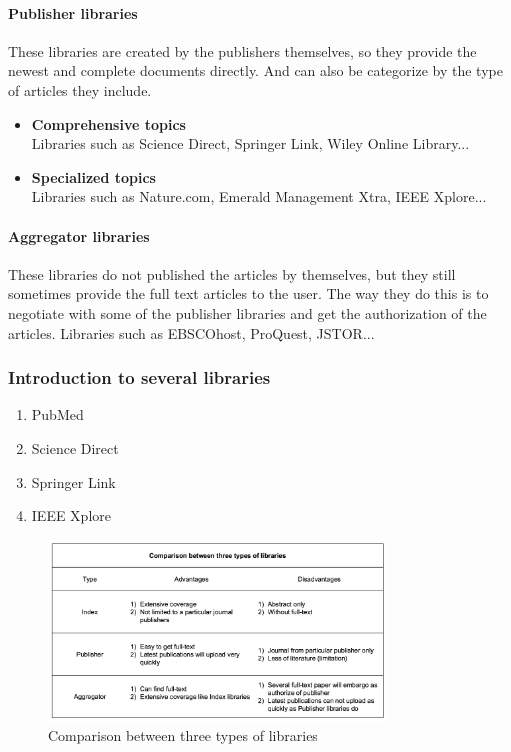 \paragraph{Publisher libraries}
	These libraries are created by the publishers themselves, so they provide the newest and complete documents directly. And can also be categorize by the type of articles they include.
	\begin{itemize}
		\item\textbf{Comprehensive topics}\\Libraries such as Science Direct, Springer Link, Wiley Online Library...
		\item\textbf{Specialized topics}\\Libraries such as Nature.com, Emerald Management Xtra, IEEE Xplore...
	\end{itemize}
\paragraph{Aggregator libraries}
	These libraries do not published the articles by themselves, but they still sometimes provide the full text articles to the user. The way they do this is to negotiate with some of the publisher libraries and get the authorization of the articles. Libraries such as EBSCOhost, ProQuest, JSTOR...

\subsubsection{Introduction to several libraries }
\begin{enumerate}
	\item {PubMed}
	\item {Science Direct}
	\item {Springer Link}
	\item {IEEE Xplore}
\end{enumerate}

\begin{figure}[htb]
	\begin{center}
		\includegraphics[width=0.8\textwidth]{WolverineChart3}
	\end{center}
	\caption{Comparison between three types of libraries}
\end{figure}
\clearpage
